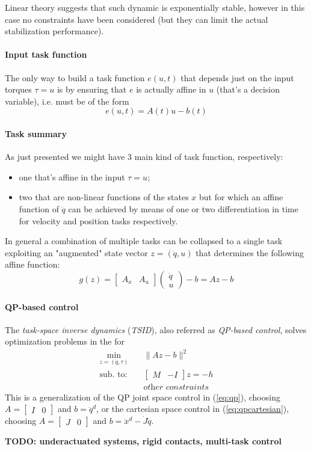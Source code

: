 	Linear theory suggests that such dynamic is exponentially stable, however in this case no constraints have been considered (but they can limit the actual stabilization performance).
	
	\paragraph{Input task function} The only way to build a task function $e(u, t)$ that depends just on the input torques $\tau = u$ is by ensuring that $e$ is actually affine in $u$ (that's a decision variable), i.e. must be of the form
	\[ e(u,t) = A(t) u - b(t) \]
	
	\paragraph{Task summary} As just presented we might have 3 main kind of task function, respectively:
	\begin{itemize}
		\item one that's affine in the input $\tau = u$;
		\item two that are non-linear functions of the states $x$ but for which an affine function of $\ddot q$ can be achieved by means of one or two differentiation in time for velocity and position tasks respectively.
	\end{itemize}
	In general a combination of multiple tasks can be collapsed to a single task exploiting an "augmented" state vector $z = (\ddot q, u)$ that determines the following affine function:
	\[ g(z) = \begin{bmatrix}
		A_x & A_u
	\end{bmatrix} \begin{pmatrix}
		\ddot q \\ u
	\end{pmatrix} - b = Az - b \]
	
	\paragraph{QP-based control} The \textit{task-space inverse dynamics} (\textit{TSID}), also referred as \textit{QP-based control}, solves optimization problems in the for
	\begin{equation}
	\begin{aligned}
		\min_{z =(\ddot q, \tau)} \quad & \big\|Az-b \big\|^2 \\
		\textrm{sub. to:} \quad & \begin{bmatrix}
			M & -I
		\end{bmatrix} z = -h \\ 
		& \textit{other constraints}
	\end{aligned}
	\end{equation}
	This is a generalization of the QP joint space control in (\ref{eq:qp}), choosing $A = \begin{bmatrix} I & 0 \end{bmatrix}$ and $b = \ddot q^d$, or the cartesian space control in (\ref{eq:qpcartesian}), choosing $A = \begin{bmatrix} J & 0 \end{bmatrix}$ and $b = \ddot x^d - \dot J \dot q$.
	
	\textbf{TODO: underactuated systems, rigid contacts, multi-task control}
	
 	
	
	
